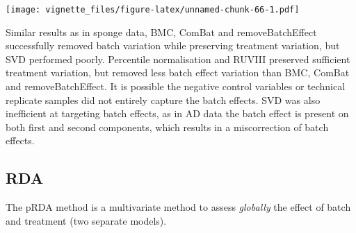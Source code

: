 \documentclass[]{book}
\begin{document}
\texttt{[image: vignette\_files/figure-latex/unnamed-chunk-66-1.pdf]}

Similar results as in sponge data, BMC, ComBat and removeBatchEffect
successfully removed batch variation while preserving treatment
variation, but SVD performed poorly. Percentile normalisation and RUVIII
preserved sufficient treatment variation, but removed less batch effect
variation than BMC, ComBat and removeBatchEffect. It is possible the
negative control variables or technical replicate samples did not
entirely capture the batch effects. SVD was also inefficient at
targeting batch effects, as in AD data the batch effect is present on
both first and second components, which results in a miscorrection of
batch effects.

\subsection{RDA}\label{rda}

The pRDA method is a multivariate method to assess \emph{globally} the
effect of batch and treatment (two separate models).
\end{document}
